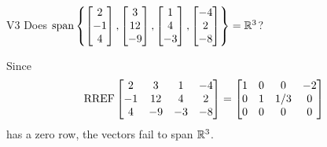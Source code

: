 \begin{problem}{V3}
Does
\(
  \operatorname{span}\left\{
    \begin{bmatrix} 2 \\ -1 \\ 4 \end{bmatrix},
    \begin{bmatrix} 3 \\ 12 \\ -9 \end{bmatrix},
    \begin{bmatrix} 1 \\ 4 \\ -3 \end{bmatrix},
    \begin{bmatrix} -4 \\ 2 \\ -8 \end{bmatrix}
  \right\} = \mathbb{R}^3
\)?
\end{problem}
\begin{solution}
Since
\[
  \operatorname{RREF}\begin{bmatrix}
    2 & 3 & 1 & -4 \\
    -1 & 12 & 4 & 2 \\
    4 & -9 & -3 & -8
  \end{bmatrix} =
  \begin{bmatrix}
    1 & 0 & 0 & -2 \\
    0 & 1 & 1/3 & 0 \\
    0 & 0 & 0 & 0
  \end{bmatrix}
\]
has a zero row, the vectors fail to span \(\mathbb{R}^3\).
\end{solution}

